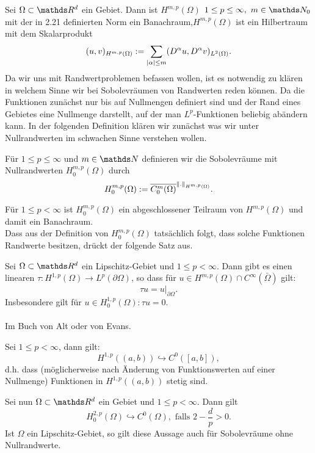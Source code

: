 Sei $\Omega\subset \R^d$ ein Gebiet.
Dann ist $H^{m,p}(\Omega)$ $1\le p\le \infty,~m\in \N_0$ mit der in 2.21 definierten Norm ein Banachraum,$H^{m,p}(\Omega)$ ist ein Hilbertraum mit dem Skalarprodukt
\[
(u,v)_{H^{m,p}(\Omega)} := \sum_{\left\vert\alpha\right\vert\le m} (D^\alpha u, D^\alpha v)_{L^2(\Omega)}.
\]
Da wir uns mit Randwertproblemen befassen wollen, ist es notwendig zu klären in welchem Sinne wir bei Sobolevräumen von Randwerten reden können.
Da die Funktionen zunächst nur bis auf Nullmengen definiert sind und der Rand eines Gebietes eine Nullmenge darstellt, auf der man $L^p$-Funktionen beliebig abändern kann.
In der folgenden Definition klären wir zunächst was wir unter Nullrandwerten im schwachen Sinne verstehen wollen.

Für $1\le p\le \infty$ und $m\in \N$ definieren wir die Sobolevräume mit Nullrandwerten $H_0^{m,p}(\Omega)$ durch
\[
H_0^{m,p}(\Omega) := \overline{C_0^m(\Omega)}^{\left\Vert.\right\Vert_{H^{m,p}(\Omega)}}.
\]

Für $1\le p<\infty$ ist $H_0^{m,p}(\Omega)$ ein abgeschlossener Teilraum von $H^{m,p}(\Omega)$ und damit ein Banachraum.\\

Dass aus der Definition von $H_0^{m,p}(\Omega)$ tatsächlich folgt, dass solche Funktionen Randwerte besitzen, drückt der folgende Satz aus.

Sei $\Omega\subset \R^d$ ein Lipschitz-Gebiet und $1\le p<\infty$.
Dann gibt es einen linearen  $\tau: H^{1,p}(\Omega) \to L^p(\partial\Omega)$, so dass für $u\in H^{m,p}(\Omega)\cap C^\infty(\bar{\Omega})$ gilt:
\[
\tau u = u|_{\partial\Omega}.
\]
Insbesondere gilt für $u\in H_0^{1,p}(\Omega): \tau u = 0$.\\

\\
Im Buch von Alt oder von Evans.

Sei $1\le p<\infty$, dann gilt:
\[
H^{1,p}((a,b)) \hookrightarrow C^0([a,b]),
\]
d.h. dass (möglicherweise nach Änderung von Funktionswerten auf einer Nullmenge) Funktionen in $H^{1,p}((a,b))$ stetig sind.

Sei nun $\Omega\subset \R^d$ ein Gebiet und $1\le p<\infty$. 
Dann gilt 
\[
H_0^{2,p}(\Omega) \hookrightarrow C^0(\Omega), \text{ falls } 2-\frac{d}{p} > 0.
\]
Ist $\Omega$ ein Lipschitz-Gebiet, so gilt diese Aussage auch für Sobolevräume ohne Nullrandwerte.\\

